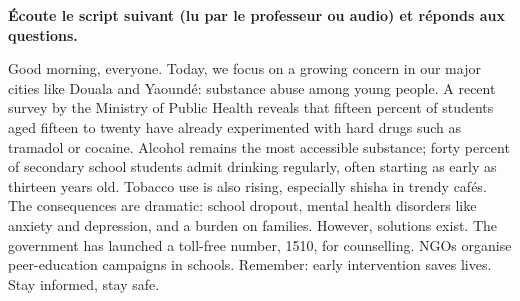 \documentclass[11pt]{article}
\begin{document}
\begin{exoresolu}
\textbf{Écoute le script suivant (lu par le professeur ou audio) et réponds aux questions.}
\begin{textebox}
Good morning, everyone. Today, we focus on a growing concern in our major cities like Douala and Yaoundé: substance abuse among young people. A recent survey by the Ministry of Public Health reveals that fifteen percent of students aged fifteen to twenty have already experimented with hard drugs such as tramadol or cocaine. Alcohol remains the most accessible substance; forty percent of secondary school students admit drinking regularly, often starting as early as thirteen years old. Tobacco use is also rising, especially shisha in trendy cafés. The consequences are dramatic: school dropout, mental health disorders like anxiety and depression, and a burden on families. However, solutions exist. The government has launched a toll-free number, 1510, for counselling. NGOs organise peer-education campaigns in schools. Remember: early intervention saves lives. Stay informed, stay safe.
\end{textebox}

\end{exoresolu}
\end{document}

